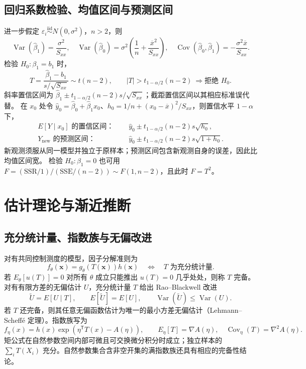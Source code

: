 \documentclass[../main.tex]{subfiles}
\begin{document}
\subsection{回归系数检验、均值区间与预测区间}
进一步假定 $\varepsilon_i\overset{\mathrm{iid}}\sim N(0,\sigma^2)$，$n>2$，则
\[
\operatorname{Var}(\widehat\beta_1)=\frac{\sigma^2}{S_{xx}},\quad
\operatorname{Var}(\widehat\beta_0)=\sigma^2\left(\frac1n+\frac{\overline x^2}{S_{xx}}\right),\quad
\operatorname{Cov}(\widehat\beta_0,\widehat\beta_1)=-\frac{\sigma^2\overline x}{S_{xx}}.
\]
检验 $H_0:\beta_1=b_1$ 时，
\[
T=\frac{\widehat\beta_1-b_1}{s/\sqrt{S_{xx}}}\sim t(n-2),\qquad
|T|>t_{1-\alpha/2}(n-2)\ \Longrightarrow\text{拒绝 }H_0.
\]
斜率置信区间为 $\widehat\beta_1\pm t_{1-\alpha/2}(n-2)s/\sqrt{S_{xx}}$；截距置信区间以其相应标准误代替。
在 $x_0$ 处令 $\widehat y_0=\widehat\beta_0+\widehat\beta_1x_0$、$h_0=1/n+(x_0-\overline x)^2/S_{xx}$，则置信水平 $1-\alpha$ 下，
\begin{align*}
E[Y\mid x_0]\text{ 的置信区间： }&\quad\widehat y_0\pm t_{1-\alpha/2}(n-2)s\sqrt{h_0},\\
Y_{\mathrm{new}}\text{ 的预测区间： }&\quad\widehat y_0\pm t_{1-\alpha/2}(n-2)s\sqrt{1+h_0}.
\end{align*}
新观测须服从同一模型并独立于原样本；预测区间包含新观测自身的误差，因此比均值区间宽。
检验 $H_0:\beta_1=0$ 也可用 $F=(\mathrm{SSR}/1)/(\mathrm{SSE}/(n-2))\sim F(1,n-2)$，且此时 $F=T^2$。
\section{估计理论与渐近推断}
\subsection{充分统计量、指数族与无偏改进}
对有共同控制测度的模型，因子分解准则为
\[
f_\theta(\bm x)=g_\theta(T(\bm x))h(\bm x)
\quad\Longleftrightarrow\quad T\text{ 为充分统计量}.
\]
若 $E_\theta[u(T)]=0$ 对所有 $\theta$ 成立只能推出 $u(T)=0$ 几乎处处，则称 $T$ 完备。对有有限方差的无偏估计 $U$，充分统计量 $T$ 给出 Rao--Blackwell 改进
\[
\widetilde U=E[U\mid T],\qquad E[\widetilde U]=E[U],\qquad
\operatorname{Var}(\widetilde U)\le\operatorname{Var}(U).
\]
若 $T$ 还完备，则其任意无偏函数估计为唯一的最小方差无偏估计（Lehmann--Scheffé 定理）。指数族写为
\[
f_\eta(x)=h(x)\exp(\eta^{\mathsf T}T(x)-A(\eta)),\qquad
E_\eta[T]=\nabla A(\eta),\quad\operatorname{Cov}_\eta(T)=\nabla^2A(\eta).
\]
矩公式在自然参数空间内部可微且可交换微分积分时成立；独立样本的 $\sum_iT(X_i)$ 充分。自然参数集合含非空开集的满指数族还具有相应的完备性结论。
\end{document}
